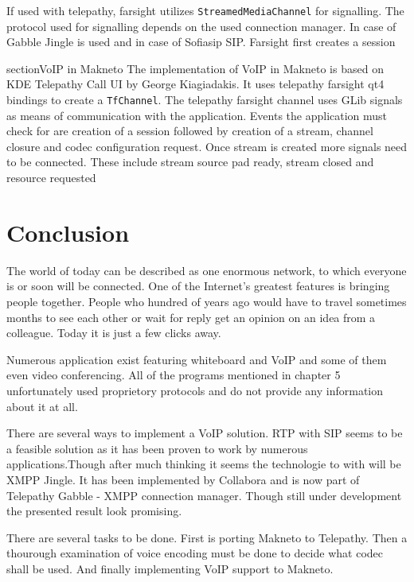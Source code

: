 If used with telepathy, farsight utilizes \verb|StreamedMediaChannel| for signalling. The protocol used for signalling depends on the used connection manager. In case of Gabble Jingle is used and in case of Sofiasip SIP. Farsight first creates a session 


section{VoIP in Makneto}
The implementation of VoIP in Makneto is based on KDE Telepathy Call UI \cite{kdeTpCallUI} by George Kiagiadakis. It uses telepathy farsight qt4 bindings to create a \verb|TfChannel|. The telepathy farsight channel uses GLib signals as means of communication with the application. Events the application must check for are creation of a session followed by creation of a stream, channel closure and codec configuration request. Once stream is created more signals need to be connected. These include stream source pad ready, stream closed and resource requested 


\chapter{Conclusion}
The world of today can be described as one enormous network, to which everyone is or soon will be connected. One of the Internet's greatest features is bringing people together. People who hundred of years ago would have to travel sometimes months to see each other or wait for reply get an opinion on an idea from a colleague. Today it is just a few clicks away.

Numerous application exist featuring whiteboard and VoIP and some of them even video conferencing. All of the programs mentioned in chapter 5 unfortunately used proprietory protocols and do not provide any information about it at all. 

There are several ways to implement a VoIP solution. RTP with SIP seems to be a feasible solution as it has been proven to work by numerous applications.Though after much thinking it seems the technologie to with will be XMPP Jingle. It has been implemented by Collabora and is now part of Telepathy Gabble - XMPP connection manager. Though still under development the presented result look promising.

There are several tasks to be done. First is porting Makneto to Telepathy. Then a thourough examination of voice encoding must be done to decide what codec shall be used. And finally implementing VoIP support to Makneto.   



